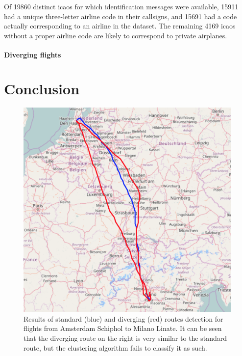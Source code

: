\documentclass{vldb}
\begin{document}
Of 19860 distinct icaos for which identification messages were available, 15911
had a unique three-letter airline code in their callsigns, and 15691 had a code
actually corresponding to an airline in the dataset. The remaining 4169
icaos without a proper airline code are likely to correspond to private airplanes.

\paragraph{Diverging flights}


\section{Conclusion}

\begin{figure}[t]
  \centering
  \includegraphics[scale=0.35]{imgs/schiphol-linate.png}
  \caption{Results of standard (blue) and diverging (red) routes detection for
    flights from Amsterdam Schiphol to Milano Linate. It can be seen that the
    diverging route on the right is very similar to the standard route, but the
    clustering algorithm fails to classify it as such.}
  \label{fig:schiphol-linate}
\end{figure}
\end{document}
